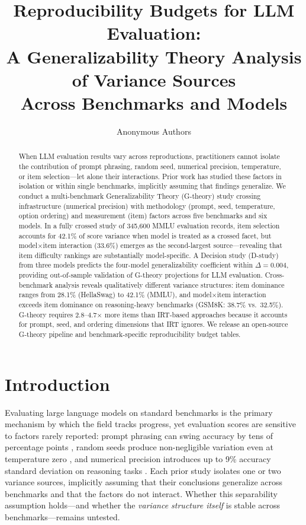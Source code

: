 \documentclass[11pt,letterpaper]{article}
\title{Reproducibility Budgets for LLM Evaluation:\\A Generalizability Theory Analysis of Variance Sources\\Across Benchmarks and Models}
\author{
Anonymous Authors
}
\date{}
\begin{document}
\maketitle

\begin{abstract}
When LLM evaluation results vary across reproductions, practitioners cannot isolate the contribution of prompt phrasing, random seed, numerical precision, temperature, or item selection---let alone their interactions.
Prior work has studied these factors in isolation or within single benchmarks, implicitly assuming that findings generalize.
We conduct a multi-benchmark Generalizability Theory (G-theory) study crossing infrastructure (numerical precision) with methodology (prompt, seed, temperature, option ordering) and measurement (item) factors across five benchmarks and six models.
In a fully crossed study of 345,600 MMLU evaluation records, item selection accounts for 42.1\% of score variance when model is treated as a crossed facet, but model$\times$item interaction (33.6\%) emerges as the second-largest source---revealing that item difficulty rankings are substantially model-specific.
A Decision study (D-study) from three models predicts the four-model generalizability coefficient within $\Delta=0.004$, providing out-of-sample validation of G-theory projections for LLM evaluation.
Cross-benchmark analysis reveals qualitatively different variance structures: item dominance ranges from 28.1\% (HellaSwag) to 42.1\% (MMLU), and model$\times$item interaction exceeds item dominance on reasoning-heavy benchmarks (GSM8K: 38.7\% vs.\ 32.5\%).
G-theory requires 2.8--4.7$\times$ more items than IRT-based approaches because it accounts for prompt, seed, and ordering dimensions that IRT ignores.
We release an open-source G-theory pipeline and benchmark-specific reproducibility budget tables.
\end{abstract}

\section{Introduction}

Evaluating large language models on standard benchmarks is the primary mechanism by which the field tracks progress, yet evaluation scores are sensitive to factors rarely reported: prompt phrasing can swing accuracy by tens of percentage points \citep{sclar2024quantifying}, random seeds produce non-negligible variation even at temperature zero \citep{thinkingmachines2025}, and numerical precision introduces up to 9\% accuracy standard deviation on reasoning tasks \citep{yuan2025}. Each prior study isolates one or two variance sources, implicitly assuming that their conclusions generalize across benchmarks and that the factors do not interact. Whether this separability assumption holds---and whether the \emph{variance structure itself} is stable across benchmarks---remains untested.
\end{document}
